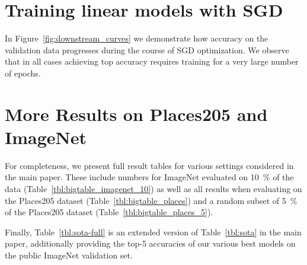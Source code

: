 \documentclass[10pt,twocolumn,letterpaper]{article}
\begin{document}
\section{Training linear models with SGD}

In Figure~\ref{fig:downstream_curves} we demonstrate how accuracy on the validation data progresses
during the course of SGD optimization.
We observe that in all cases achieving top accuracy requires training for a very large number of epochs.


\section{More Results on Places205 and ImageNet}

For completeness, we present full result tables for various settings considered in the main paper. 
These include numbers for ImageNet evaluated on \SI{10}{\percent} of the data (Table~\ref{tbl:bigtable_imagenet_10}) as well as all results when evaluating on the Places205 dataset (Table~\ref{tbl:bigtable_places}) and a random subset of \SI{5}{\percent} of the Places205 dataset (Table~\ref{tbl:bigtable_places_5}).

Finally, Table~\ref{tbl:sota-full} is an extended version of Table~\ref{tbl:sota} in the main paper, additionally providing the top-5 accuracies of our various best models on the public ImageNet validation set.
\end{document}
